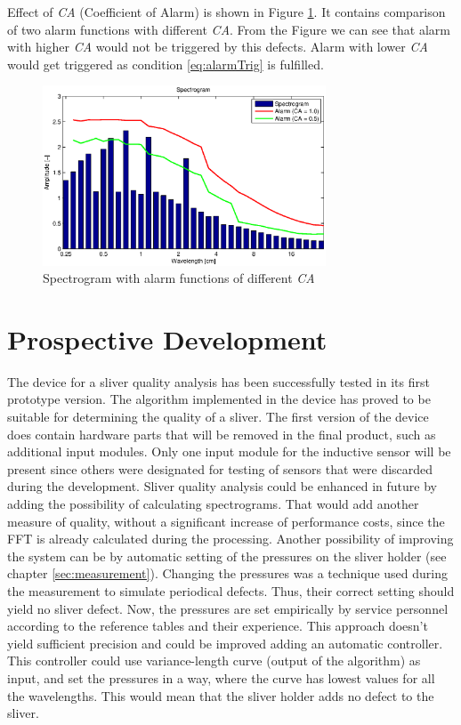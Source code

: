 \documentclass[twoside]{ctuthesis}
\theoremstyle{plain}
\theoremstyle{definition}
\theoremstyle{note}
\begin{document}
Effect of \textit{CA} (Coefficient of Alarm) is shown in Figure \ref{fig:alarm2}. It contains comparison of two alarm functions with different \textit{CA}. From the Figure we can see that alarm with higher \textit{CA} would not be triggered by this defects. Alarm with lower \textit{CA} would get triggered as condition \ref{eq:alarmTrig} is fulfilled.
\begin{figure}[h]
	\centering
	\includegraphics[width=0.75\textwidth]{moire1_alarm.eps}
	\caption{Spectrogram with alarm functions of different \textit{CA}}
	\label{fig:alarm2}
\end{figure}
\chapter{Prospective Development}
The device for a sliver quality analysis has been successfully tested in its first prototype version. The algorithm implemented in the device has proved to be suitable for determining the quality of a sliver. The first version of the device does contain hardware parts that will be removed in the final product, such as additional input modules. Only one input module for the inductive sensor will be present since others were designated for testing of sensors that were discarded during the development.
Sliver quality analysis could be enhanced in future by adding the possibility of calculating spectrograms. That would add another measure of quality, without a significant increase of performance costs, since the FFT is already calculated during the processing. 
Another possibility of improving the system can be by automatic setting of the pressures on the sliver holder (see chapter \ref{sec:measurement}). Changing the pressures was a technique used during the measurement to simulate periodical defects. Thus, their correct setting should yield no sliver defect. Now, the pressures are set empirically by service personnel according to the reference tables and their experience. This approach doesn't yield sufficient precision and could be improved adding an automatic controller. This controller could use variance-length curve (output of the algorithm) as input, and set the pressures in a way, where the curve has lowest values for all the wavelengths. This would mean that the sliver holder adds no defect to the sliver.
\end{document}
